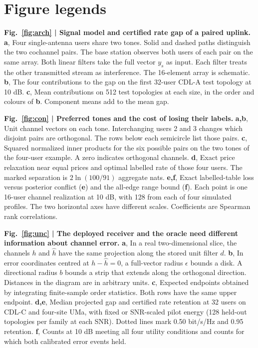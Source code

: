 \documentclass[lineno,pdflatex,sn-nature]{sn-jnl}
\begin{document}
\clearpage\section*{Figure legends}
\noindent\textbf{Fig.~\ref{fig:arch} | Signal model and certified rate gap of a paired uplink.} \textbf{a}, Four single-antenna users share two tones. Solid and dashed paths distinguish the two cochannel pairs. The base station observes both users of each pair on the same array. Both linear filters take the full vector \(y_s\) as input. Each filter treats the other transmitted stream as interference. The 16-element array is schematic. \textbf{b}, The four contributions to the gap on the first 32-user CDL-A test topology at 10 dB. \textbf{c}, Mean contributions on 512 test topologies at each size, in the order and colours of \textbf{b}. Component means add to the mean gap.\par\medskip
\noindent\textbf{Fig.~\ref{fig:con} | Preferred tones and the cost of losing their labels.} \textbf{a,b}, Unit channel vectors on each tone. Interchanging users 2 and 3 changes which disjoint pairs are orthogonal. The rows below each semicircle list those pairs. \textbf{c}, Squared normalized inner products for the six possible pairs on the two tones of the four-user example. A zero indicates orthogonal channels. \textbf{d}, Exact price relaxation near equal prices and optimal labelled rate of those four users. The marked separation is \(2\ln(100/91)\) aggregate nats. \textbf{e,f}, Exact labelled-table loss versus posterior conflict (\textbf{e}) and the all-edge range bound (\textbf{f}). Each point is one 16-user channel realization at 10 dB, with 128 from each of four simulated profiles. The two horizontal axes have different scales. Coefficients are Spearman rank correlations.\par\medskip
\noindent\textbf{Fig.~\ref{fig:unc} | The deployed receiver and the oracle need different information about channel error.} \textbf{a}, In a real two-dimensional slice, the channels \(h\) and \(\hat h\) have the same projection along the stored unit filter \(d\). \textbf{b}, In error coordinates centred at \(h-\hat h=0\), a full-vector radius \(\epsilon\) bounds a disk. A directional radius \(b\) bounds a strip that extends along the orthogonal direction. Distances in the diagram are in arbitrary units. \textbf{c}, Expected endpoints obtained by integrating finite-sample order statistics. Both rows have the same upper endpoint. \textbf{d,e}, Median projected gap and certified rate retention at 32 users on CDL-C and four-site UMa, with fixed or SNR-scaled pilot energy (128 held-out topologies per family at each SNR). Dotted lines mark 0.50 bit/s/Hz and 0.95 retention. \textbf{f}, Counts at 10 dB meeting all four utility conditions and counts for which both calibrated error events held.\par\medskip
\end{document}
